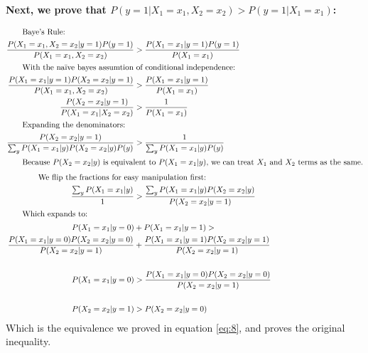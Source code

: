 \documentclass{article}
\begin{document}
        \noindent\textbf{ Next, we prove that $P(y=1|X_1=x_1, X_2=x_2) > P(y=1|X_1=x_1)$:}
        
        \begin{align}
            \intertext{\qquad Baye's Rule:}
            \frac{P(X_1=x_1, X_2=x_2|y=1)P(y=1)}{P(X_1=x_1, X_2=x_2)} 
                &> \frac{P(X_1=x_1|y=1)P(y=1)}{P(X_1=x_1)} \\
            \intertext{\qquad With the naïve bayes assumtion of conditional independence:}
            \frac{P(X_1=x_1|y=1)P(X_2=x_2|y=1)}{P(X_1=x_1, X_2=x_2)} 
                &> \frac{P(X_1=x_1|y=1)}{P(X_1=x_1)} \\
            \frac{P(X_2=x_2|y=1)}{P(X_1=x_1|X_2=x_2)}
                &> \frac{1}{P(X_1=x_1)}\\
            \intertext{\qquad Expanding the denominators:}
            \frac{P(X_2=x_2|y=1)}{\sum_y P(X_1=x_1|y)P(X_2=x_2|y)P(y)} 
                &> \frac{1}{\sum_y P(X_1=x_1|y)P(y)}\\
            \intertext{\qquad Because $P(X_2=x_2|y)$ is equivalent to $P(X_1=x_1|y)$, we can treat $X_1$ and $X_2$ terms as the same.}
            \intertext{\qquad \qquad We flip the fractions for easy manipulation first:}
            \frac{\sum_y P(X_1=x_1|y)}{1}
                &> \frac{\sum_y P(X_1=x_1|y)P(X_2=x_2|y)}{P(X_2=x_2|y=1)} \\
            \intertext{\qquad Which expands to:}
            P(X_1=x_1|y=0) &+ P(X_1=x_1|y=1)
                > \nonumber\\ 
                \frac{P(X_1=x_1|y=0)P(X_2=x_2|y=0)}{P(X_2=x_2|y=1)} &+ \frac{P(X_1=x_1|y=1)P(X_2=x_2|y=1)}{P(X_2=x_2|y=1)} \nonumber \\
            &\nonumber\\
            P(X_1=x_1|y=0) &> \frac{P(X_1=x_1|y=0)P(X_2=x_2|y=0)}{P(X_2=x_2|y=1)}\nonumber\\
            &\nonumber\\
            P(X_2=x_2|y=1) &> P(X_2=x_2|y=0)
        \end{align}
        Which is the equivalence we proved in equation \eqref{eq:8}, and proves the original inequality.
    
            
\end{document}
